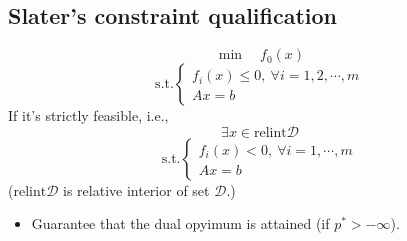 \subsection{Slater's constraint qualification}
$$
\min \quad f_0(x)
$$
$$
\text{s.t.} 
\begin{cases}
    f_i(x) \le 0, \ \forall i = 1, 2, \cdots, m \\
    Ax = b
\end{cases}
$$
If it's strictly feasible, i.e., 
$$
\exists x \in \text{relint}\mathcal{D} 
$$
$$
\text{s.t.} 
\begin{cases}
    f_i(x) < 0, \ \forall i = 1, \cdots, m \\
    Ax = b    
\end{cases}
$$
($\text{relint}\mathcal{D}$ is relative interior of set $\mathcal{D}$.)
\begin{itemize}
    \item Guarantee that the dual opyimum is attained (if $p^* > - \infty$).
\end{itemize}

